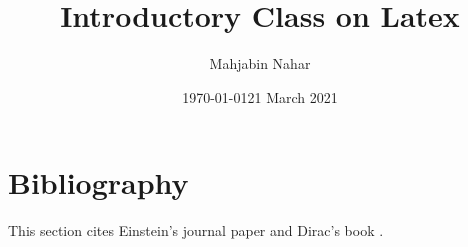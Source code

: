 \documentclass[16pt, a4paper]{article} %
\title{Introductory Class on Latex}
\author{Mahjabin Nahar}
\date{\today}
\date{21 March 2021}
\begin{document}
\maketitle
\tableofcontents %
\pagebreak %

\section{Bibliography}
This section cites Einstein's journal paper \cite{einstein} and Dirac's book \cite{dirac}. 

\printbibliography

% 
\end{document}

